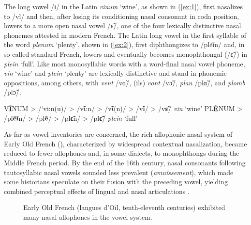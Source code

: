 \documentclass[output=paper,colorlinks,citecolor=brown]{langscibook}
\begin{document}
The long vowel /i/ in the Latin \textit{vinum} ‘wine’, as shown in (\ref{ex:1}), first nasalizes to /vĩ/ and then, after losing its conditioning nasal consonant in coda position, lowers to a more open nasal vowel /ɛ̃/, one of the four lexically distinctive nasal phonemes attested in modern French. The Latin long vowel in the first syllable of the word \textit{plenum} ‘plenty’, shown in (\ref{ex:2}), first diphthongizes to /plẽĩn/ and, in so-called standard French, lowers and eventually becomes monophthongal (/ɛ̃/) in \textit{plein} ‘full’. Like most monosyllabic words with a word-final nasal vowel phoneme, \textit{vin} ‘wine’ and \textit{plein} ‘plenty’ are lexically distinctive and stand in phonemic oppositions, among others, with \textit{vent} /vɑ̃/, (ils) \textit{vont} /vɔ̃/, \textit{plan} /plɑ̃/, and \textit{plomb} /plɔ̃/.

\ea \label{ex:1}
V\textbf{Ĩ}NUM > /`vi:n(u)/ > /v\textbf{ĩ}:n/ > /v\textbf{ĩ}(n)/ >
/v\textbf{ĩ}/ > /v\textbf{ɛ̃}/ \textit{vin} `wine'
\z
\ea \label{ex:2}
PL\textbf{Ẽ}NUM > /pl\textbf{ẽĩ}n/ > /pl\textbf{ẽ}/ > /pl\textbf{ɛ̃}n/ > /pl\textbf{ɛ̃}/ \textit{plein} `full'
\z

As far as vowel inventories are concerned, the rich allophonic nasal system of Early Old French (), characterized by widespread contextual nasalization, became reduced to fewer allophones and, in some dialects, to monophthongs during the Middle French period. By the end of the 16th century, nasal consonants following tautosyllabic nasal vowels sounded less prevalent (\textit{amuïssement}), which made some historians speculate on their fusion with the preceding vowel, yielding combined perceptual effects of lingual and nasal articulations \citep[][34]{Morin1994}.

\begin{figure}

    \caption{Early Old French (langues d’Oïl, tenth-eleventh centuries) exhibited many nasal allophones in the vowel system.}
    \label{fig:1}
\end{figure}
\end{document}
